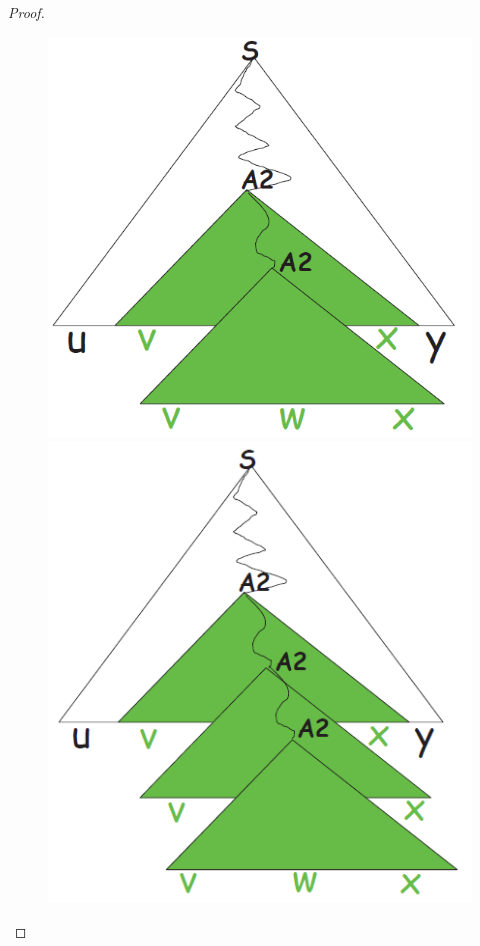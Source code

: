 \documentclass[class=book, crop=false, oneside, 12pt]{standalone}
\begin{document}
\begin{proof}
  \begin{figure}[H]
    \centering
    \begin{minipage}{0.25\textwidth}
      \centering
      \includegraphics[width=\textwidth,keepaspectratio]{pl-proof_3}
    \end{minipage}
     \hfill
    \begin{minipage}{0.25\textwidth}
      \centering
      \includegraphics[width=\textwidth,keepaspectratio]{pl-proof_4}
    \end{minipage}
  \end{figure}



\end{proof}
\end{document}
